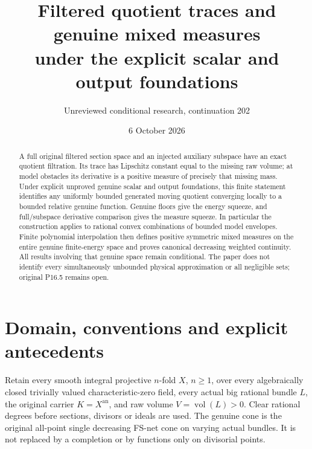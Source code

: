 \documentclass[11pt]{article}
\title{Filtered quotient traces and genuine mixed measures\protect\\
under the explicit scalar and output foundations}
\author{Unreviewed conditional research, continuation 202}
\date{6 October 2026}
\newcommand{\vol}{\operatorname{vol}}
\begin{document}
\maketitle
\begin{abstract}
A full original filtered section space and an injected auxiliary
subspace have an exact quotient filtration. Its trace has Lipschitz
constant equal to the missing raw volume; at model obstacles its
derivative is a positive measure of precisely that missing mass.
Under explicit unproved genuine scalar and output foundations,
this finite statement identifies any uniformly bounded generated
moving quotient converging locally to a bounded relative genuine
function. Genuine floors give the energy squeeze, and full/subspace
derivative comparison gives the measure squeeze.
In particular the construction applies to rational convex combinations
of bounded model envelopes. Finite polynomial interpolation then defines
positive symmetric mixed measures on the entire genuine finite-energy
space and proves canonical decreasing weighted continuity.
All results involving that genuine space remain conditional.
The paper does not identify every simultaneously unbounded physical
approximation or all negligible sets; original P16.5 remains open.
\end{abstract}

\section{Domain, conventions and explicit antecedents}
Retain every smooth integral projective $n$-fold $X$, $n\geq1$, over
every algebraically closed trivially valued characteristic-zero field,
every actual big rational bundle $L$, the original carrier
$K=X^{\mathrm{an}}$, and raw volume $V=\vol(L)>0$.
Clear rational degrees before sections, divisors or ideals are used.
The genuine cone is the original all-point single decreasing FS-net
cone on varying actual bundles. It is not replaced by a completion
or by functions only on divisorial points.
\end{document}
